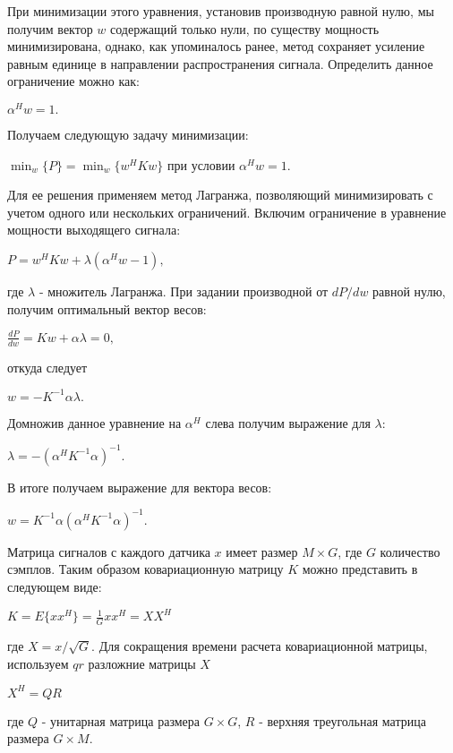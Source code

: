\documentclass[a4paper,12pt]{report}
\begin{document}
	При минимизации этого уравнения, установив производную равной нулю, мы получим вектор $w$ содержащий только нули, по существу мощность минимизирована, однако, как упоминалось ранее, метод сохраняет усиление равным единице в направлении распространения сигнала. Определить данное ограничение можно как:
	\begin{center}
		$\alpha^Hw = 1.$
	\end{center}
    Получаем следующую задачу минимизации:
    \begin{center}
    	$\min_{w} \{P\} = \min_{w} \{w^HKw\}$
    	при условии $\alpha^Hw = 1.$
    \end{center}
	Для ее решения применяем метод Лагранжа, позволяющий минимизировать с учетом одного или нескольких ограничений. Включим ограничение в уравнение мощности выходящего сигнала:
	\begin{center}
		$P = w^HKw + \lambda(\alpha^Hw - 1),$
	\end{center}
	где $\lambda$ - множитель Лагранжа. 
	При задании производной от $dP/dw$ равной нулю, получим оптимальный вектор весов:
	\begin{center}
		$\frac{dP}{dw} = Kw + \alpha \lambda = 0,$
	\end{center}
	откуда следует
	\begin{center}
		$w = -K^{-1} \alpha \lambda.$
	\end{center}
	Домножив данное уравнение на $\alpha^H$ слева получим выражение для $\lambda$:
	\begin{center}
		$\lambda = -(\alpha^HK^{-1} \alpha)^{-1}.$
	\end{center}
	В итоге получаем выражение для вектора весов:
	\begin{center}
		$w = K^{-1} \alpha(\alpha^HK^{-1} \alpha)^{-1}.$
	\end{center}  
	Матрица сигналов с каждого датчика $x$ имеет размер  $M \times G$, где $G$ количество сэмплов. Таким образом ковариационную матрицу $K$ можно представить в следующем виде:
	\begin{center}
		$K = E\{xx^H\} = \frac{1}{G}xx^H = XX^H$
	\end{center}
	где $X = x/\sqrt{G}$. 
	Для сокращения времени расчета ковариационной матрицы, используем $qr$ разложние матрицы $X$
	\begin{center}
		$X^H = QR$
	\end{center}
	где $Q$ - унитарная матрица размера $G \times G$, $R$ - верхняя треугольная матрица размера $G \times M$.
	
\end{document}
